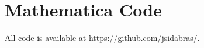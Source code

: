 \chapter[Mathematica Code]{Mathematica Code}
All code is available at https://github.com/jsidabras/.

